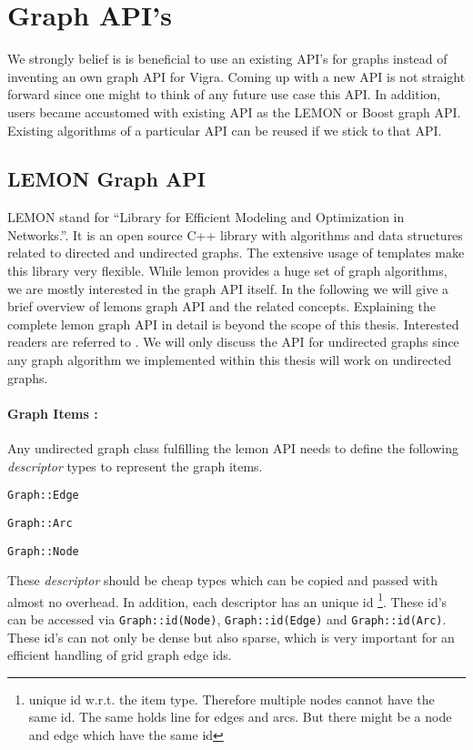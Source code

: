 
\section{Graph API's}\label{sec:graph_apis}

We strongly belief is is beneficial to use an existing API's for
graphs instead of inventing an own graph API for Vigra.
Coming up with a new API is not straight forward
since one might to think of any future use case this API.
In addition, users became accustomed with existing API as 
the LEMON or Boost graph API.
Existing algorithms of a particular API can be reused if we stick
to that API.




\subsection{LEMON Graph API}\label{sec:lemon_graph_apis}
    LEMON \citet{ software_lemon} 
    stand for  ``Library for Efficient Modeling and Optimization in Networks.''.
    It is an open source C++ library with algorithms and data structures 
    related to directed and undirected graphs.
    The extensive usage of templates make this library very flexible.
    While lemon provides a huge set of graph algorithms,
    we are mostly interested in the graph API itself.
    In the following we will give a brief overview of lemons graph 
    API and the related concepts.
    Explaining the complete lemon graph API in detail
    is beyond the scope of this thesis.
    Interested readers are referred to \citet{software_lemon}.
    We will only discuss the API for undirected graphs since any
    graph algorithm we implemented within this thesis
    will work on undirected graphs.

\paragraph{Graph Items :}
    Any undirected graph class fulfilling the lemon API needs to define 
    the following \emph{descriptor} types to represent the graph items.
    \begin{compactitem}
    \item \lstinline{Graph::Edge}
    \item \lstinline{Graph::Arc}
    \item \lstinline{Graph::Node}
    \end{compactitem}
    These \emph{descriptor} should be cheap types which can be copied
    and passed with almost no overhead.
    In addition, each descriptor has an unique id
    \footnote{ unique id w.r.t. the item type. 
    Therefore  multiple  nodes cannot have the same id.
    The same holds line for edges and arcs.
    But there might be a node and edge which have the same id}.
    These id's can be accessed via \lstinline{Graph::id(Node)}, \lstinline{Graph::id(Edge)} and \lstinline{Graph::id(Arc)}.
    These id's can not only be dense but also sparse, which is very
    important for an efficient handling of grid graph edge ids.



